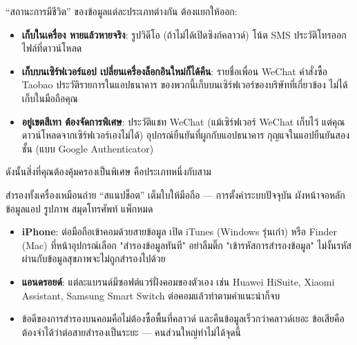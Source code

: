 


“สถานะการมีชีวิต” ของข้อมูลแต่ละประเภทต่างกัน ต้องแยกให้ออก:

\begin{itemize}
  \item \textbf{เก็บในเครื่อง หายแล้วหายจริง}: รูปวิดีโอ (ถ้าไม่ได้เปิดซิงก์คลาวด์) โน้ต SMS ประวัติโทรออก ไฟล์ที่ดาวน์โหลด
  \item \textbf{เก็บบนเซิร์ฟเวอร์แอป เปลี่ยนเครื่องล็อกอินใหม่ก็ได้คืน}: รายชื่อเพื่อน WeChat คำสั่งซื้อ Taobao ประวัติรายการในแอปธนาคาร ของพวกนี้เก็บบนเซิร์ฟเวอร์ของบริษัทที่เกี่ยวข้อง ไม่ได้เก็บในมือถือคุณ
  \item \textbf{อยู่เขตสีเทา ต้องจัดการพิเศษ}: ประวัติแชท WeChat (แม้เซิร์ฟเวอร์ WeChat เก็บไว้ แต่คุณดาวน์โหลดจากเซิร์ฟเวอร์เองไม่ได้) อุปกรณ์ยืนยันที่ผูกกับแอปธนาคาร กุญแจในแอปยืนยันสองชั้น (แบบ Google Authenticator)
\end{itemize}

ดังนั้นสิ่งที่คุณต้องคุ้มครองเป็นพิเศษ คือประเภทหนึ่งกับสาม


สำรองทั้งเครื่องเหมือนถ่าย “สแนปช็อต” เต็มใบให้มือถือ — การตั้งค่าระบบปัจจุบัน ผังหน้าจอหลัก ข้อมูลแอป รูปภาพ สมุดโทรศัพท์ แพ็กหมด


\begin{itemize}
  \item \textbf{iPhone}: ต่อมือถือเข้าคอมด้วยสายข้อมูล เปิด iTunes (Windows รุ่นเก่า) หรือ Finder (Mac) ที่หน้าอุปกรณ์เลือก "สำรองข้อมูลทันที" อย่าลืมติ๊ก "เข้ารหัสการสำรองข้อมูล" ไม่งั้นรหัสผ่านกับข้อมูลสุขภาพจะไม่ถูกสำรองไปด้วย
  \item \textbf{แอนดรอยด์}: แต่ละแบรนด์มีซอฟต์แวร์ฝั่งคอมของตัวเอง เช่น Huawei HiSuite, Xiaomi Assistant, Samsung Smart Switch ต่อคอมแล้วทำตามคำแนะนำก็จบ
  \item ข้อดีของการสำรองบนคอมคือไม่ต้องซื้อพื้นที่คลาวด์ และคืนข้อมูลเร็วกว่าคลาวด์เยอะ ข้อเสียคือต้องจำได้ว่าต่อสายสำรองเป็นระยะ — คนส่วนใหญ่ทำไม่ได้จุดนี้
\end{itemize}

